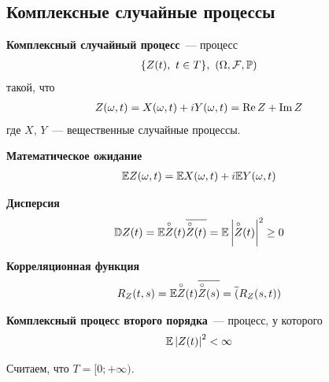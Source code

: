 \subsection{Комплексные случайные процессы}
\begin{Def}
    \textbf{Комплексный случайный процесс}~--- процесс
    \begin{align*}
      & \{Z(t), \ t \in T\}, \ (\Omega, \mathcal{F}, \mathbb{P})
    \end{align*}
    такой, что
    \begin{align*}
      & Z(\omega, t) = X(\omega, t) + iY(\omega,t) = \operatorname{Re} Z + \operatorname{Im} Z
    \end{align*}
    где $X$, $Y$~--- вещественные случайные процессы.
\end{Def}
\begin{Def}
    \textbf{Математическое ожидание}
    \begin{align*}
      & \mathbb{E} Z(\omega, t) = \mathbb{E} X(\omega, t) + i \mathbb{E} Y(\omega,t)
    \end{align*}
\end{Def}
\begin{Def}
    \textbf{Дисперсия}
    \begin{align*}
      & \mathbb{D} Z(t) = \mathbb{E}\overset{\circ}{Z}(t) \overline{\overset{\circ}{Z}(t)} = \mathbb{E} \left| \overset{\circ}{Z}(t) \right|^2 \geq 0
    \end{align*}
\end{Def}
\begin{Def}
    \textbf{Корреляционная функция}
    \begin{align*}
      & R_Z(t,s) = \mathbb{E}\overset{\circ}{Z}(t) \overline{\overset{\circ}{Z}(s)} = \overline(R_Z(s,t))
    \end{align*}
\end{Def}
\begin{Def}
    \textbf{Комплексный процесс второго порядка}~--- процесс, у которого
    \begin{align*}
      & \mathbb{E} \left| Z(t) \right|^2 < \infty
    \end{align*}
\end{Def}
Считаем, что $T = [0; +\infty)$.
